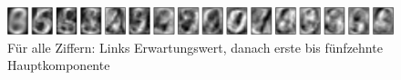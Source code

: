 \documentclass{article}
\begin{document}
\begin{figure}[h]
\caption{Für alle Ziffern: Links Erwartungswert, danach erste bis fünfzehnte Hauptkomponente}
\centering
\includegraphics[width=\textwidth]{all_digits}
\end{figure}
\end{document}
